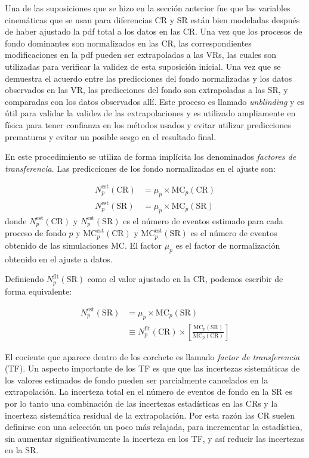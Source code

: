 Una de las suposiciones que se hizo en la sección anterior fue que las variables
cinemáticas que se usan para diferencias CR y SR están bien modeladas
después de haber ajustado la pdf total a los datos en las CR. Una vez que los
procesos de fondo dominantes son normalizados en las CR, las correspondientes
modificaciones en la pdf pueden ser extrapoladas a las VRs, las cuales son
utilizadas para verificar la validez de esta suposición inicial. Una vez que se
demuestra el acuerdo entre las predicciones del fondo normalizadas y los datos
observados en las VR, las predicciones del fondo son extrapoladas a las SR,
y comparadas con los datos observados allí. Este proceso es llamado
\emph{unblinding} y es útil para validar la validez de las extrapolaciones y es
utilizado ampliamente en física para tener confianza en los métodos usados y
evitar utilizar predicciones prematuras y evitar un posible sesgo en el
resultado final.

En este procedimiento se utiliza de forma implícita los
denominados \emph{factores de transferencia}. Las predicciones de los fondo
normalizadas en el ajuste son:

\begin{align}
  N_p^{\text{est}}(\text{CR}) &= \mu_p \times \text{MC}_p (\text{CR})
  \\ N_p^{\text{est}}(\text{SR}) &= \mu_p \times \text{MC}_p (\text{SR})
\end{align}
%
donde $N_p^{\text{est}}(\text{CR})$ y $N_p^{\text{est}}(\text{SR})$ es el número
de eventos estimado para cada proceso de fondo $p$ y
$\text{MC}_p^{\text{est}}(\text{CR})$ y $\text{MC}_p^{\text{est}}(\text{SR})$ es
el número de eventos obtenido de las simulaciones MC. El factor $\mu_p$ es el
factor de normalización obtenido en el ajuste a datos.


Definiendo $N_p^\text{fit}(\text{SR})$ como el valor ajustado en la CR, podemos
escribir de forma equivalente:

\begin{align}
  N_p^\text{est}(\text{SR}) &= \mu_p \times \text{MC}_p (\text{SR}) \nonumber
  \\ &\equiv N_p^\text{fit}(\text{CR}) \times \left[
    \frac{\text{MC}_p(\text{SR})}{\text{MC}_p(\text{CR})} \right]
\end{align}

El cociente que aparece dentro de los corchete es llamado \emph{factor de
  transferencia} (TF). Un aspecto importante de los TF es que que las incertezas
sistemáticas de los valores estimados de fondo pueden ser parcialmente
cancelados en la extrapolación. La incerteza total en el número de eventos de
fondo en la SR es por lo tanto una combinación de las incertezas estadísticas en
las CRs y la incerteza sistemática residual de la extrapolación. Por esta razón
las CR suelen definirse con una selección un poco más relajada, para incrementar
la estadística, sin aumentar significativamente la incerteza en los TF, y así
reducir las incertezas en la SR.


